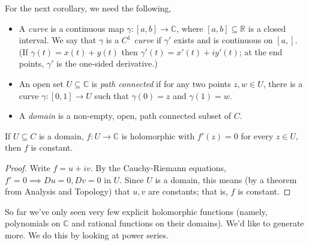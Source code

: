 For the next corollary, we need the following,
\begin{definition}{}{}
    \leavevmode
    \begin{itemize}
        \item A \textit{curve} is a continuous map \(\gamma: [a,b] \to \mathbb{C}\), where \([a,b]\subseteq \mathbb{R}\) is a closed interval. We say that \(\gamma\) is a \textit{\(C^1\) curve} if \(\gamma'\) exists and is continuous on \([a,]\). (If \(\gamma(t) = x(t) + y(t)\) then \(\gamma'(t) = x'(t) + iy'(t)\); at the end points, \(\gamma'\) is the one-sided derivative.)
        \item An open set \(U \subseteq \mathbb{C}\) is \textit{path connected} if for any two points \(z,w \in U\), there is a curve \(\gamma: [0,1] \to U\) such that \(\gamma(0) = z\) and \(\gamma(1) = w\).
        \item A \textit{domain} is a non-empty, open, path connected subset of \(C\).
    \end{itemize}
\end{definition}
\begin{corollary}{}{}
    If \(U\subseteq C\) is a domain, \(f: U\to \mathbb{C}\) is holomorphic with \(f'(z) = 0\) for every \(z \in U\), then \(f\) is constant.
\end{corollary}
\begin{proof}
    Write \(f = u + iv\). By the Cauchy-Riemann equations, \(f'=0 \implies Du = 0, Dv=0\) in \(U\). Since \(U\) is a domain, this means (by a theorem from Analysis and Topology) that \(u,v\) are constants; that is, \(f\) is constant.
\end{proof}
So far we've only seen very few explicit holomorphic functions (namely, polynomials on \(\mathbb{C}\) and rational functions on their domains). We'd like to generate more. We do this by looking at power series.

